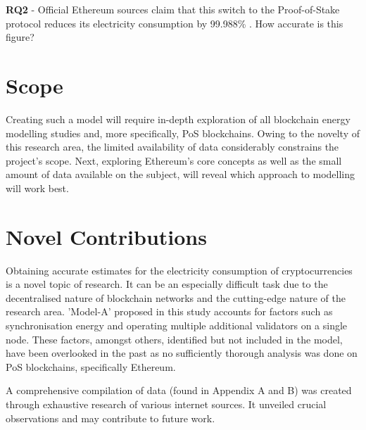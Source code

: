\textbf{RQ2} - Official Ethereum sources claim that this switch to the Proof-of-Stake protocol reduces its electricity consumption by 99.988\% \cite{EthereumEthereum.orgc}. How accurate is this figure?

\section{Scope}
Creating such a model will require in-depth exploration of all blockchain energy modelling studies and, more specifically, PoS blockchains. Owing to the novelty of this research area, the limited availability of data considerably constrains the project's scope. Next, exploring Ethereum's core concepts as well as the small amount of data available on the subject, will reveal which approach to modelling will work best.  


\section{Novel Contributions}
Obtaining accurate estimates for the electricity consumption of cryptocurrencies is a novel topic of research. It can be an especially difficult task due to the decentralised nature of blockchain networks and the cutting-edge nature of the research area. 'Model-A' proposed in this study accounts for factors such as synchronisation energy and operating multiple additional validators on a single node. These factors, amongst others, identified but not included in the model, have been overlooked in the past as no sufficiently thorough analysis was done on PoS blockchains, specifically Ethereum.

A comprehensive compilation of data (found in Appendix A and B) was created through exhaustive research of various internet sources. It unveiled crucial observations and may contribute to future work.
